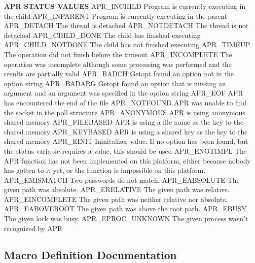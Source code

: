 \begin{DoxyPre}
{\bfseries APR STATUS VALUES}
APR\_INCHILD        Program is currently executing in the child
APR\_INPARENT       Program is currently executing in the parent
APR\_DETACH         The thread is detached
APR\_NOTDETACH      The thread is not detached
APR\_CHILD\_DONE     The child has finished executing
APR\_CHILD\_NOTDONE  The child has not finished executing
APR\_TIMEUP         The operation did not finish before the timeout
APR\_INCOMPLETE     The operation was incomplete although some processing
                   was performed and the results are partially valid
APR\_BADCH          Getopt found an option not in the option string
APR\_BADARG         Getopt found an option that is missing an argument
                   and an argument was specified in the option string
APR\_EOF            APR has encountered the end of the file
APR\_NOTFOUND       APR was unable to find the socket in the poll structure
APR\_ANONYMOUS      APR is using anonymous shared memory
APR\_FILEBASED      APR is using a file name as the key to the shared memory
APR\_KEYBASED       APR is using a shared key as the key to the shared memory
APR\_EINIT          Ininitalizer value.  If no option has been found, but
                   the status variable requires a value, this should be used
APR\_ENOTIMPL       The APR function has not been implemented on this
                   platform, either because nobody has gotten to it yet,
                   or the function is impossible on this platform.
APR\_EMISMATCH      Two passwords do not match.
APR\_EABSOLUTE      The given path was absolute.
APR\_ERELATIVE      The given path was relative.
APR\_EINCOMPLETE    The given path was neither relative nor absolute.
APR\_EABOVEROOT     The given path was above the root path.
APR\_EBUSY          The given lock was busy.
APR\_EPROC\_UNKNOWN  The given process wasn't recognized by APR
\end{DoxyPre}
 

\subsection{Macro Definition Documentation}
